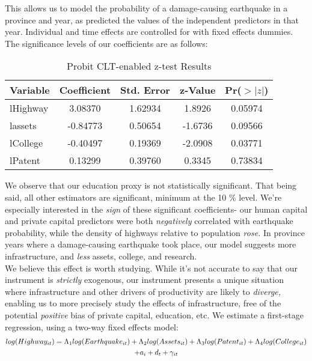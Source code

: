 \documentclass[11pt]{article}
\begin{document}
This allows us to model the probability of a damage-causing earthquake in a province and year, as predicted the values of the independent predictors in that year. Individual and time effects are controlled for with fixed effects dummies. The significance levels of our coefficients are as follows:\\  


\begin{table}[H]
\centering
\caption{Probit CLT-enabled z-test Results}
\label{tab:joint_significance}
\begin{tabular}{lcccc}
\toprule
\textbf{Variable} & \textbf{Coefficient} & \textbf{Std. Error} & \textbf{z-Value}& \textbf{Pr($>|z|$)}\\
\midrule
lHighway& 3.08370& 1.62934& 1.8926& 0.05974\\
lassets& -0.84773& 0.50654& -1.6736& 0.09566\\
 lCollege& -0.40497& 0.19369& -2.0908&0.03771\\
lPatent& 0.13299& 0.39760& 0.3345& 0.73834\\
\bottomrule
\end{tabular}
\end{table}


We observe that our education proxy is not statistically significant. That being said, all other estimators are significant, minimum at the 10 \% level. We’re especially interested in the \textit{sign }of these significant coefficients- our human capital and private capital predictors were both \textit{negatively }correlated with earthquake probability, while the density of highways relative to population \textit{rose. }In province years where a damage-causing earthquake took place, our model suggests more infrastructure, and \textit{less} assets, college, and research. \\

We believe this effect is worth studying. While it’s not accurate to say that our instrument is \textit{strictly }exogenous, our instrument presents a unique situation where infrastructure and other drivers of productivity are likely to \textit{diverge, }enabling us to more precisely study the effects of infrastructure, free of the potential \textit{positive} bias of private capital, education, etc. We estimate a first-stage regression, using a two-way fixed effects model:\\

\begin{multline}
\small
log(Highway_{it})=\Lambda_1log(Earthquake_{it})+\Lambda_2log(Assets_{it})+\Lambda_3log(Patent_{it})+\Lambda_4log(College_{it})\\
\small
+a_i+d_t+\gamma_{it}\\
\end{multline}
\end{document}
